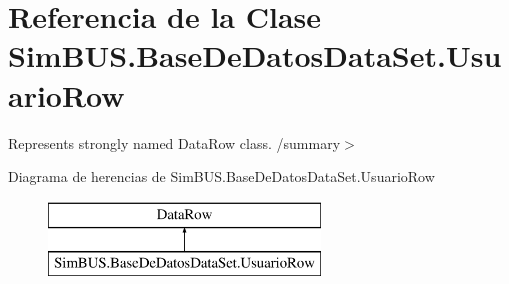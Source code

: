 \section{Referencia de la Clase Sim\-B\-U\-S.\-Base\-De\-Datos\-Data\-Set.\-Usuario\-Row}
\label{class_sim_b_u_s_1_1_base_de_datos_data_set_1_1_usuario_row}


Represents strongly named Data\-Row class. /summary$>$  


Diagrama de herencias de Sim\-B\-U\-S.\-Base\-De\-Datos\-Data\-Set.\-Usuario\-Row\begin{figure}[H]
\begin{center}
\leavevmode
\includegraphics[height=2.000000cm]{class_sim_b_u_s_1_1_base_de_datos_data_set_1_1_usuario_row}
\end{center}
\end{figure}
